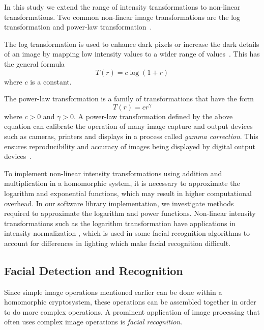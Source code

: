 In this study we extend the range of intensity transformations to non-linear transformations. Two common non-linear image transformations are the log transformation and power-law transformation~\cite{gonzalez_digital_2008}.

The log transformation is used to enhance dark pixels or increase the dark details of an image by mapping low intensity values to a wider range of values~\cite{gonzalez_digital_2008}. This has the general formula
\begin{equation}
    T\left(r\right) = c \log\left(1 + r\right)
\end{equation}
where $c$ is a constant.

The power-law transformation is a family of transformations that have the form
\begin{equation}
    T\left(r\right) = c r^{\gamma}
\end{equation}
where $c>0$ and $\gamma > 0$.
A power-law transformation defined by the above equation can calibrate the operation of many image capture and output devices such as cameras, printers and displays in a process called \textit{gamma correction}. This ensures reproducibility and accuracy of images being displayed by digital output devices~\cite{gonzalez_digital_2008}.

To implement non-linear intensity transformations using addition and multiplication in a homomorphic system, it is necessary to approximate the logarithm and exponential functions, which may result in higher computational overhead. In our software library implementation, we investigate methods required to approximate the logarithm and power functions. Non-linear intensity transformations such as the logarithm transformation have applications in intensity normalization \cite{oravec_illumination_2010}, which is used in some facial recognition algorithms to account for differences in lighting which make facial recognition difficult.

\subsection{Facial Detection and Recognition}

Since simple image operations mentioned earlier can be done within a homomorphic cryptosystem, these operations can be assembled together in order to do more complex operations. A prominent application of image processing that often uses complex image operations is \textit{facial recognition}.


